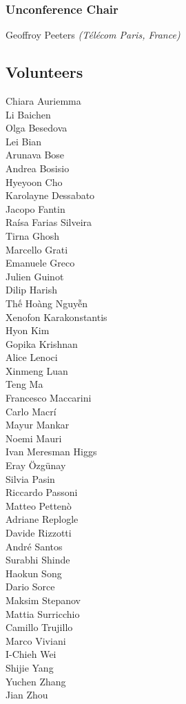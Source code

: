 \subsubsection*{Unconference Chair}
Geoffroy Peeters \emph{(Télécom Paris, France)}



\subsection*{Volunteers}

\begin{multicols}{3}
Chiara Auriemma\\
Li Baichen\\
Olga Besedova\\
Lei Bian\\
Arunava Bose\\
Andrea Bosisio\\
Hyeyoon Cho\\
Karolayne Dessabato\\
Jacopo Fantin\\
Raísa Farias Silveira\\
Tirna Ghosh\\
Marcello Grati\\
Emanuele Greco\\
Julien Guinot\\
Dilip Harish\\
Th\'{\^{e}} Hoàng Nguy\~{\^{e}}n\\
Xenofon Karakonstantis\\
Hyon Kim\\
Gopika Krishnan\\
Alice Lenoci\\
Xinmeng Luan\\
Teng Ma\\
Francesco Maccarini\\
Carlo Macrí\\
Mayur Mankar\\
Noemi Mauri\\
Ivan Meresman Higgs\\
Eray Özgünay\\
Silvia Pasin\\
Riccardo Passoni\\
Matteo Pettenò\\
Adriane Replogle\\
Davide Rizzotti\\
André Santos\\
Surabhi Shinde\\
Haokun Song\\
Dario Sorce\\
Maksim Stepanov\\
Mattia Surricchio\\
Camillo Trujillo\\
Marco Viviani\\
I-Chieh Wei\\
Shijie Yang\\
Yuchen Zhang\\
Jian Zhou\\
\end{multicols}